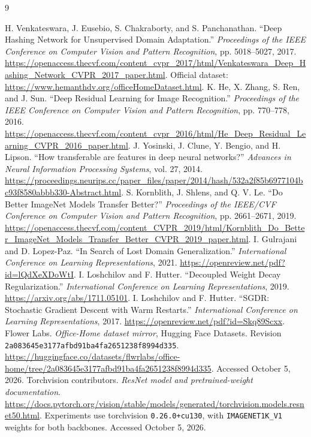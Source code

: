 \documentclass[10pt,a4paper]{article}
\begin{document}
\clearpage
\begin{thebibliography}{9}\raggedright
{} H. Venkateswara, J. Eusebio, S. Chakraborty, and S. Panchanathan. ``Deep Hashing Network for Unsupervised Domain Adaptation.'' \emph{Proceedings of the IEEE Conference on Computer Vision and Pattern Recognition}, pp. 5018--5027, 2017. \url{https://openaccess.thecvf.com/content_cvpr_2017/html/Venkateswara_Deep_Hashing_Network_CVPR_2017_paper.html}. Official dataset: \url{https://www.hemanthdv.org/officeHomeDataset.html}.
 K. He, X. Zhang, S. Ren, and J. Sun. ``Deep Residual Learning for Image Recognition.'' \emph{Proceedings of the IEEE Conference on Computer Vision and Pattern Recognition}, pp. 770--778, 2016. \url{https://openaccess.thecvf.com/content_cvpr_2016/html/He_Deep_Residual_Learning_CVPR_2016_paper.html}.
 J. Yosinski, J. Clune, Y. Bengio, and H. Lipson. ``How transferable are features in deep neural networks?'' \emph{Advances in Neural Information Processing Systems}, vol. 27, 2014. \url{https://proceedings.neurips.cc/paper_files/paper/2014/hash/532a2f85b6977104bc93f8580abbb330-Abstract.html}.
 S. Kornblith, J. Shlens, and Q. V. Le. ``Do Better ImageNet Models Transfer Better?'' \emph{Proceedings of the IEEE/CVF Conference on Computer Vision and Pattern Recognition}, pp. 2661--2671, 2019. \url{https://openaccess.thecvf.com/content_CVPR_2019/html/Kornblith_Do_Better_ImageNet_Models_Transfer_Better_CVPR_2019_paper.html}.
 I. Gulrajani and D. Lopez-Paz. ``In Search of Lost Domain Generalization.'' \emph{International Conference on Learning Representations}, 2021. \url{https://openreview.net/pdf?id=lQdXeXDoWtI}.
 I. Loshchilov and F. Hutter. ``Decoupled Weight Decay Regularization.'' \emph{International Conference on Learning Representations}, 2019. \url{https://arxiv.org/abs/1711.05101}.
 I. Loshchilov and F. Hutter. ``SGDR: Stochastic Gradient Descent with Warm Restarts.'' \emph{International Conference on Learning Representations}, 2017. \url{https://openreview.net/pdf?id=Skq89Scxx}.
 Flower Labs. \emph{Office-Home dataset mirror}, Hugging Face Datasets. Revision \texttt{2a083645e3177afbd91ba4fa2651238f8994d335}. \url{https://huggingface.co/datasets/flwrlabs/office-home/tree/2a083645e3177afbd91ba4fa2651238f8994d335}. Accessed October 5, 2026.
 Torchvision contributors. \emph{ResNet model and pretrained-weight documentation}. \url{https://docs.pytorch.org/vision/stable/models/generated/torchvision.models.resnet50.html}. Experiments use torchvision \texttt{0.26.0+cu130}, with \texttt{IMAGENET1K\_V1} weights for both backbones. Accessed October 5, 2026.
\end{thebibliography}
\end{document}
